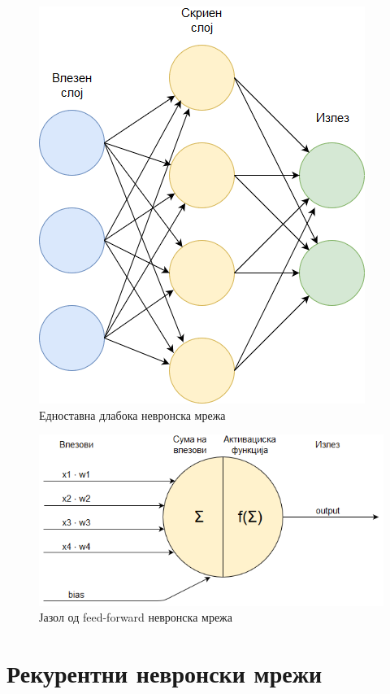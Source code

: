 \begin{figure}[H]
	\centering
    \includegraphics[scale=0.66]{images/nn.png}
	\caption{Едноставна длабока невронска мрежа}
	\label{fig:nn}
\end{figure}

\begin{figure}[H]
	\centering
    \includegraphics[scale=0.6]{images/nn_cell.png}
	\caption{Јазол од feed-forward невронска мрежа}
	\label{fig:ff_node}
\end{figure}


\section{Рекурентни невронски мрежи}

